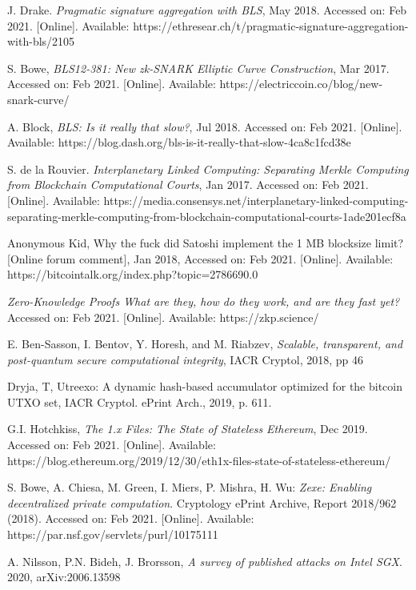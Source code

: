 \documentclass[peerreview]{ieeesyscoin}
\begin{document}
\begin{thebibliography}{00}
 J. Drake. \textit{Pragmatic signature aggregation with BLS}, May 2018. Accessed on: Feb 2021. [Online]. Available:  https://ethresear.ch/t/pragmatic-signature-aggregation-with-bls/2105

 S. Bowe, \textit{BLS12-381: New zk-SNARK Elliptic Curve Construction}, Mar 2017. Accessed on: Feb 2021. [Online]. Available: https://electriccoin.co/blog/new-snark-curve/

  A. Block, \textit{BLS: Is it really that slow?}, Jul 2018. Accessed on: Feb 2021. [Online]. Available: https://blog.dash.org/bls-is-it-really-that-slow-4ca8c1fcd38e

  S. de la Rouvier. \textit{Interplanetary Linked Computing: Separating Merkle Computing from Blockchain Computational Courts}, Jan 2017. Accessed on: Feb 2021. [Online]. Available: https://media.consensys.net/interplanetary-linked-computing-separating-merkle-computing-from-blockchain-computational-courts-1ade201ecf8a

 Anonymous Kid, Why the fuck did Satoshi implement the 1 MB blocksize limit? [Online forum comment], Jan 2018, Accessed on: Feb 2021. [Online]. Available:  https://bitcointalk.org/index.php?topic=2786690.0

 \textit{Zero-Knowledge Proofs What are they, how do they work, and are they fast yet?} Accessed on: Feb 2021. [Online]. Available: https://zkp.science/

 E. Ben-Sasson, I. Bentov, Y. Horesh, and M. Riabzev, \textit{Scalable, transparent, and post-quantum secure computational integrity}, IACR Cryptol, 2018, pp 46 

 Dryja, T, Utreexo: A dynamic hash-based accumulator optimized for the bitcoin UTXO set, IACR Cryptol. ePrint Arch., 2019, p. 611.

 G.I. Hotchkiss, \textit{The 1.x Files: The State of Stateless Ethereum}, Dec 2019. Accessed on: Feb 2021. [Online]. Available:   https://blog.ethereum.org/2019/12/30/eth1x-files-state-of-stateless-ethereum/

 S. Bowe, A. Chiesa, M. Green, I. Miers, P. Mishra, H. Wu: \textit{Zexe: Enabling decentralized private computation}. Cryptology ePrint Archive, Report 2018/962 (2018). Accessed on: Feb 2021. [Online]. Available:  https://par.nsf.gov/servlets/purl/10175111

 A. Nilsson, P.N. Bideh, J. Brorsson, \textit{A survey of published attacks on Intel SGX}. 2020, arXiv:2006.13598


\end{thebibliography}
\end{document}
